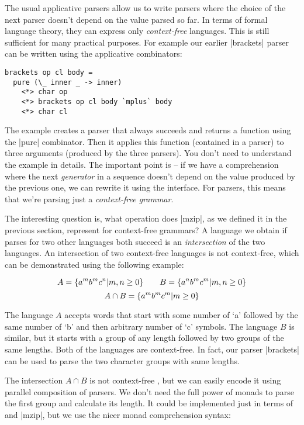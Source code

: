 \documentclass{tmr}
\begin{document}
The usual applicative parsers allow us to write parsers where the choice of the next parser 
doesn't depend on the value parsed so far. In terms of formal language theory, they can express 
only \textit{context-free} languages. This is still sufficient for many practical purposes. For 
example our earlier |brackets| parser can be written using the applicative combinators:

\begin{verbatim}
brackets op cl body = 
  pure (\_ inner _ -> inner)
    <*> char op
    <*> brackets op cl body `mplus` body
    <*> char cl
\end{verbatim}
The example creates a parser that always succeeds and returns a function using the |pure| 
combinator. Then it applies this function (contained in a parser) to three arguments (produced
by the three parsers). You don't need to understand the example in details. The important
point is -- if we have a comprehension where the next \textit{generator} in a sequence
doesn't depend on the value produced by the previous one, we can rewrite it using the 
 interface. For parsers, this means that we're parsing just a 
\textit{context-free grammar}.

The interesting question is, what operation does |mzip|, as we defined it in the previous section,
represent for context-free grammars? A language we obtain if parses for two other languages both 
succeed is an \textit{intersection} of the two languages. An intersection of two context-free 
languages is not context-free, which can be demonstrated using the following example:

\[ 
A = \{ a^m b^m c^n \arrowvert m, n \geq 0 \} 
\qquad
B = \{ a^n b^m c^m \arrowvert m, n \geq 0 \} 
\]
\[ 
A \cap B = \{ a^m b^m c^m \arrowvert m \geq 0 \}
\]

The language $A$ accepts words that start with some number of `a' followed by the same
number of `b' and then arbitrary number of `c' symbols. The language $B$ is similar, but it
starts with a group of any length followed by two groups of the same lengths. Both of the
languages are context-free. In fact, our parser |brackets| can be used to parse the two 
character groups with same lengths.

The intersection $A \cap B$ is not context-free \cite{cflintersect}, but we can easily
encode it using parallel composition of parsers. We don't need the full power of monads
to parse the first group and calculate its length. It could be implemented just in terms of
 and |mzip|, but we use the nicer monad comprehension syntax:
\end{document}
